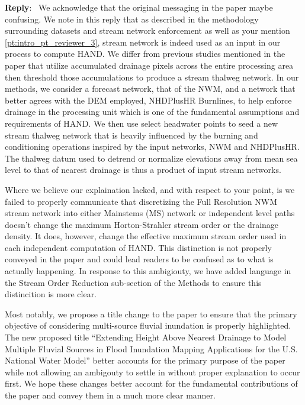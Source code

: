 \documentclass[11pt]{article}
\newcounter{reviewer}
\newcounter{point}[reviewer]
\newenvironment{reply}
   {\medskip \noindent \begin{sf}\textbf{Reply}:\  }
   {\medskip \end{sf}}
\begin{document}
\begin{reply}
We acknowledge that the original messaging in the paper maybe confusing.
We note in this reply that as described in the methodology surrounding datasets and stream network enforcement as well as your mention \ref{pt:intro_pt_reviewer_3}, stream network is indeed used as an input in our process to compute HAND.
We differ from previous studies mentioned in the paper that utilize accumulated drainage pixels across the entire processing area then threshold those accumulations to produce a stream thalweg network.
In our methods, we consider a forecast network, that of the NWM, and a network that better agrees with the DEM employed, NHDPlusHR Burnlines, to help enforce drainage in the processing unit which is one of the fundamental assumptions and requirements of HAND.
We then use select headwater points to seed a new stream thalweg network that is heavily influenced by the burning and conditioning operations inspired by the input networks, NWM and NHDPlusHR.
The thalweg datum used to detrend or normalize elevations away from mean sea level to that of nearest drainage is thus a product of input stream networks.

Where we believe our explaination lacked, and with respect to your point, is we failed to properly communicate that discretizing the Full Resolution NWM stream network into either Mainstems (MS) network or independent level paths doesn't change the maximum Horton-Strahler stream order or the drainage density.
It does, however, change the effective maximum stream order used in each independent computation of HAND.
This distinction is not properly conveyed in the paper and could lead readers to be confused as to what is actually happening.
In response to this ambigiouty, we have added language in the Stream Order Reduction sub-section of the Methods to ensure this distincition is more clear.

Most notably, we propose a title change to the paper to ensure that the primary objective of considering multi-source fluvial inundation is properly highlighted.
The new proposed title ``Extending Height Above Nearest Drainage to Model Multiple Fluvial Sources in Flood Inundation Mapping Applications for the U.S. National Water Model'' better accounts for the primary purpose of the paper while not allowing an ambigouty to settle in without proper explanation to occur first.
We hope these changes better account for the fundamental contributions of the paper and convey them in a much more clear manner.
\end{reply}
\end{document}
